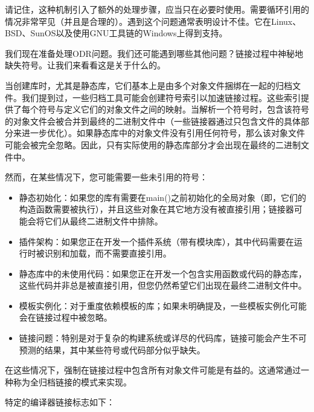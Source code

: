 
请记住，这种机制引入了额外的处理步骤，应当只在必要时使用。需要循环引用的情况非常罕见（并且是合理的）。遇到这个问题通常表明设计不佳。它在Linux、BSD、SunOS以及使用GNU工具链的Windows上得到支持。

我们现在准备处理ODR问题。我们还可能遇到哪些其他问题？链接过程中神秘地缺失符号。让我们来看看这是关于什么的。


当创建库时，尤其是静态库，它们基本上是由多个对象文件捆绑在一起的归档文件。我们提到过，一些归档工具可能会创建符号索引以加速链接过程。这些索引提供了每个符号与定义它们的对象文件之间的映射。当解析一个符号时，包含该符号的对象文件会被合并到最终的二进制文件中（一些链接器通过只包含文件的具体部分来进一步优化）。如果静态库中的对象文件没有引用任何符号，那么该对象文件可能会被完全忽略。因此，只有实际使用的静态库部分才会出现在最终的二进制文件中。

然而，在某些情况下，您可能需要一些未引用的符号：

\begin{itemize}
\item
静态初始化：如果您的库有需要在main()之前初始化的全局对象（即，它们的构造函数需要被执行），并且这些对象在其它地方没有被直接引用；链接器可能会将它们从最终二进制文件中排除。

\item
插件架构：如果您正在开发一个插件系统（带有模块库），其中代码需要在运行时被识别和加载，而不需要直接引用。

\item
静态库中的未使用代码：如果您正在开发一个包含实用函数或代码的静态库，这些代码并非总是被直接引用，但您仍然希望它们出现在最终二进制文件中。

\item
模板实例化：对于重度依赖模板的库；如果未明确提及，一些模板实例化可能会在链接过程中被忽略。

\item
链接问题：特别是对于复杂的构建系统或详尽的代码库，链接可能会产生不可预测的结果，其中某些符号或代码部分似乎缺失。
\end{itemize}

在这些情况下，强制在链接过程中包含所有对象文件可能是有益的。这通常通过一种称为全归档链接的模式来实现。

特定的编译器链接标志如下：

